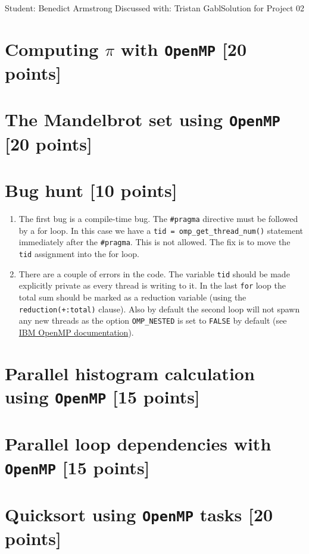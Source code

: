 \documentclass[unicode,11pt,a4paper,oneside,numbers=endperiod,openany]{scrartcl}
\begin{document}
\setassignment
{}

{Student: Benedict Armstrong}
{Discussed with: Tristan Gabl}{Solution for Project 02}{}
\newline

\assignmentpolicy

\section{Computing $\pi$ with \texttt{OpenMP} [20 points]}

\section{The Mandelbrot set  using \texttt{OpenMP} [20 points]}

\section{Bug hunt [10 points]}

\begin{enumerate}
    \item The first bug is a compile-time bug. The \texttt{\#pragma} directive must be followed by a for loop. In this case we have a \texttt{tid = omp\_get\_thread\_num()} statement immediately after the \texttt{\#pragma}. This is not allowed. The fix is to move the \texttt{tid} assignment into the for loop.
    \item There are a couple of errors in the code. The variable \texttt{tid} should be made explicitly private as every thread is writing to it. In the last \texttt{for} loop the total sum should be marked as a reduction variable (using the \texttt{reduction(+:total)} clause). Also by default the second loop will not spawn any new threads as the option \texttt{OMP\_NESTED} is set to \texttt{FALSE} by default (see \href{https://www.ibm.com/docs/en/xl-c-aix/13.1.2?topic=openmp-omp-nested}{IBM OpenMP documentation}).

\end{enumerate}

\section{Parallel histogram calculation using \texttt{OpenMP} [15 points]}

\section{Parallel loop dependencies with \texttt{OpenMP} [15 points]}

\section{Quicksort using \texttt{OpenMP} tasks [20 points]}
\end{document}
